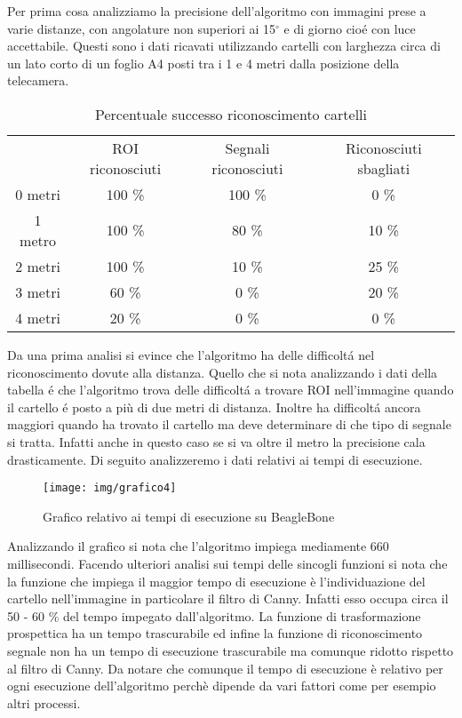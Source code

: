 	Per prima cosa analizziamo la precisione dell'algoritmo con immagini prese a varie distanze, con angolature non superiori ai 15$^{\circ}$ e di giorno cio\'e con luce accettabile.
	Questi sono i dati ricavati utilizzando cartelli con larghezza circa di un lato corto di un foglio A4 posti tra i 1 e 4 metri dalla posizione della telecamera.

	\begin{table}[h]
		\centering
		\begin{tabular}{cccc}
		        & ROI riconosciuti & Segnali riconosciuti & Riconosciuti sbagliati \\
			0 metri & 100 \%                & 100 \%  &	0 \%             \\
			1 metro & 100 \%                & 80 \%   &	10 \%               \\
			2 metri & 100 \%                 & 10 \%  &	25 \%  	            \\
			3 metri & 60 \%                  & 0 \%   &	20 \% 	              \\
			4 metri & 20 \%                  & 0 \%   &	0 \% 	             
		\end{tabular}
		\caption{Percentuale successo riconoscimento cartelli}
	\end{table}

    Da una prima analisi si evince che l'algoritmo ha delle difficolt\'a nel riconoscimento dovute alla distanza. Quello che si nota analizzando i dati della tabella \'e che l'algoritmo trova delle difficolt\'a a trovare ROI nell'immagine quando il cartello \'e posto a più di due metri di distanza. Inoltre ha difficolt\'a ancora maggiori quando ha trovato il cartello ma deve determinare di che tipo di segnale si tratta. Infatti anche in questo caso se si va oltre il metro la precisione cala drasticamente. Di seguito analizzeremo i dati relativi ai tempi di esecuzione.

    \begin{figure}[!ht]
		\centering
		\texttt{[image: img/grafico4]}
		\caption[Grafico tempi di esecuzione]{Grafico relativo ai tempi di esecuzione su BeagleBone}
	\end{figure}

	Analizzando il grafico si nota che l'algoritmo impiega mediamente 660 millisecondi. Facendo ulteriori analisi sui tempi delle sincogli funzioni si nota che la funzione che impiega il maggior tempo di esecuzione è l'individuazione del cartello nell'immagine in particolare il filtro di Canny. Infatti esso occupa circa il 50 - 60 \% del tempo impegato dall'algoritmo. La funzione di trasformazione prospettica ha un tempo trascurabile ed infine la funzione di riconoscimento segnale non ha un tempo di esecuzione trascurabile ma comunque ridotto rispetto al filtro di Canny. Da notare che comunque il tempo di esecuzione è relativo per ogni esecuzione dell'algoritmo perchè dipende da vari fattori come per esempio altri processi.

